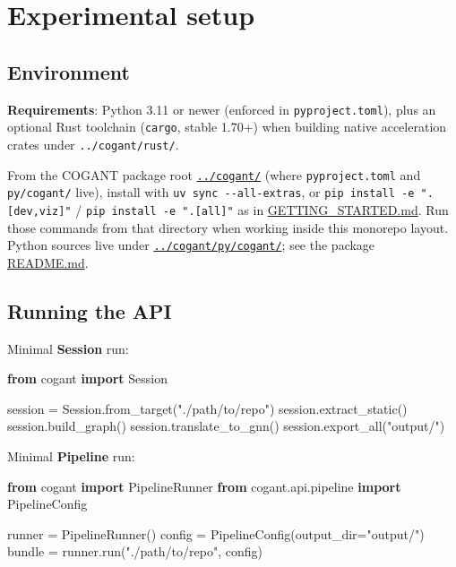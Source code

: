 \documentclass[
]{article}
\newenvironment{Shaded}{}{}
\newcommand{\ImportTok}[1]{\textcolor[rgb]{0.00,0.50,0.00}{\textbf{#1}}}
\newcommand{\NormalTok}[1]{#1}
\newcommand{\OperatorTok}[1]{\textcolor[rgb]{0.40,0.40,0.40}{#1}}
\newcommand{\StringTok}[1]{\textcolor[rgb]{0.25,0.44,0.63}{#1}}
\begin{document}
\newpage

\section{Experimental setup}\label{experimental-setup-1}

\subsection{Environment}\label{environment-1}

\textbf{Requirements}: Python 3.11 or newer (enforced in
\texttt{pyproject.toml}), plus an optional Rust toolchain
(\texttt{cargo}, stable 1.70+) when building native acceleration crates
under \texttt{../cogant/rust/}.

From the COGANT package root \href{../cogant/}{\texttt{../cogant/}}
(where \texttt{pyproject.toml} and \texttt{py/cogant/} live), install
with \texttt{uv\ sync\ -\/-all-extras}, or
\texttt{pip\ install\ -e\ ".{[}dev,viz{]}"} /
\texttt{pip\ install\ -e\ ".{[}all{]}"} as in
\href{../cogant/GETTING_STARTED.md}{GETTING\_STARTED.md}. Run those
commands from that directory when working inside this monorepo layout.
Python sources live under
\href{../cogant/py/cogant/}{\texttt{../cogant/py/cogant/}}; see the
package \href{../cogant/README.md}{README.md}.

\subsection{Running the API}\label{running-the-api-1}

Minimal \textbf{Session} run:

\begin{Shaded}
\begin{Highlighting}[]
\ImportTok{from}\NormalTok{ cogant }\ImportTok{import}\NormalTok{ Session}

\NormalTok{session }\OperatorTok{=}\NormalTok{ Session.from\_target(}\StringTok{"./path/to/repo"}\NormalTok{)}
\NormalTok{session.extract\_static()}
\NormalTok{session.build\_graph()}
\NormalTok{session.translate\_to\_gnn()}
\NormalTok{session.export\_all(}\StringTok{"output/"}\NormalTok{)}
\end{Highlighting}
\end{Shaded}

Minimal \textbf{Pipeline} run:

\begin{Shaded}
\begin{Highlighting}[]
\ImportTok{from}\NormalTok{ cogant }\ImportTok{import}\NormalTok{ PipelineRunner}
\ImportTok{from}\NormalTok{ cogant.api.pipeline }\ImportTok{import}\NormalTok{ PipelineConfig}

\NormalTok{runner }\OperatorTok{=}\NormalTok{ PipelineRunner()}
\NormalTok{config }\OperatorTok{=}\NormalTok{ PipelineConfig(output\_dir}\OperatorTok{=}\StringTok{"output/"}\NormalTok{)}
\NormalTok{bundle }\OperatorTok{=}\NormalTok{ runner.run(}\StringTok{"./path/to/repo"}\NormalTok{, config)}
\end{Highlighting}
\end{Shaded}
\end{document}

